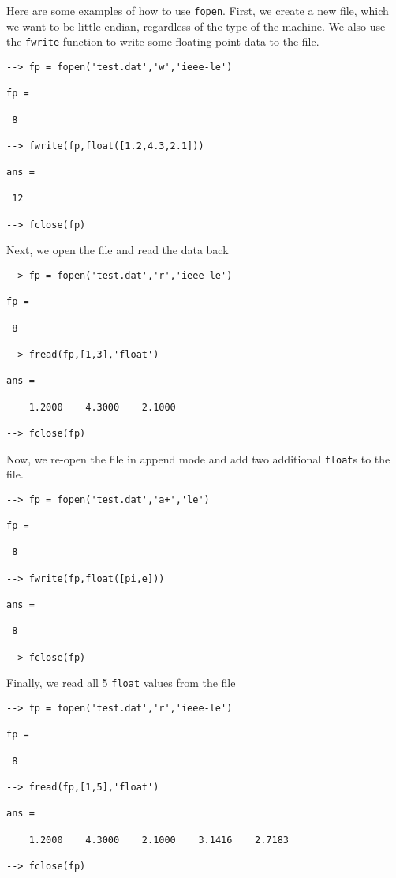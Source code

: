 Here are some examples of how to use \verb|fopen|.  First, we create a new 
file, which we want to be little-endian, regardless of the type of the machine.
We also use the \verb|fwrite| function to write some floating point data to
the file.
\begin{verbatim}
--> fp = fopen('test.dat','w','ieee-le')

fp = 

 8 

--> fwrite(fp,float([1.2,4.3,2.1]))

ans = 

 12 

--> fclose(fp)
\end{verbatim}
Next, we open the file and read the data back
\begin{verbatim}
--> fp = fopen('test.dat','r','ieee-le')

fp = 

 8 

--> fread(fp,[1,3],'float')

ans = 

    1.2000    4.3000    2.1000 

--> fclose(fp)
\end{verbatim}
Now, we re-open the file in append mode and add two additional \verb|float|s to the
file.
\begin{verbatim}
--> fp = fopen('test.dat','a+','le')

fp = 

 8 

--> fwrite(fp,float([pi,e]))

ans = 

 8 

--> fclose(fp)
\end{verbatim}
Finally, we read all 5 \verb|float| values from the file
\begin{verbatim}
--> fp = fopen('test.dat','r','ieee-le')

fp = 

 8 

--> fread(fp,[1,5],'float')

ans = 

    1.2000    4.3000    2.1000    3.1416    2.7183 

--> fclose(fp)
\end{verbatim}
